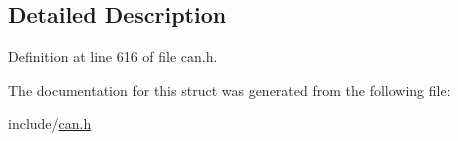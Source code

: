 \subsection{Detailed Description}


Definition at line 616 of file can.\+h.



The documentation for this struct was generated from the following file\+:\begin{DoxyCompactItemize}
\item 
include/\mbox{\hyperlink{can_8h}{can.\+h}}\end{DoxyCompactItemize}
